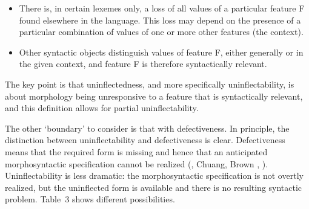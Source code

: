 \documentclass[output=paper]{langscibook}
\begin{document}
\begin{itemize}
\item \begin{styleListParagraph}
There is, in certain lexemes only, a loss of all values of a particular feature F found elsewhere in the language. This loss may depend on the presence of a particular combination of values of one or more other features (the context).
\end{styleListParagraph}
\item \begin{styleListParagraph}
Other syntactic objects distinguish values of feature F, either generally or in the given context, and feature F is therefore syntactically relevant.
\end{styleListParagraph}
\end{itemize}

The key point is that uninflectedness, and more specifically uninflectability, is about morphology being unresponsive to a feature that is syntactically relevant, and this definition allows for partial uninflectability.

The other ‘boundary’ to consider is that with defectiveness. In principle, the distinction between uninflectability and defectiveness is clear. Defectiveness means that the required form is missing and hence that an anticipated morphosyntactic specification cannot be realized (\citealt{BaermanCorbett2010}, Chuang, Brown \citealt{BaayenEvans2022}, \citealt{Sims2023}). Uninflectability is less dramatic: the morphosyntactic specification is not overtly realized, but the uninflected form is available and there is no resulting syntactic problem. Table~3 shows different possibilities. 
\end{document}
